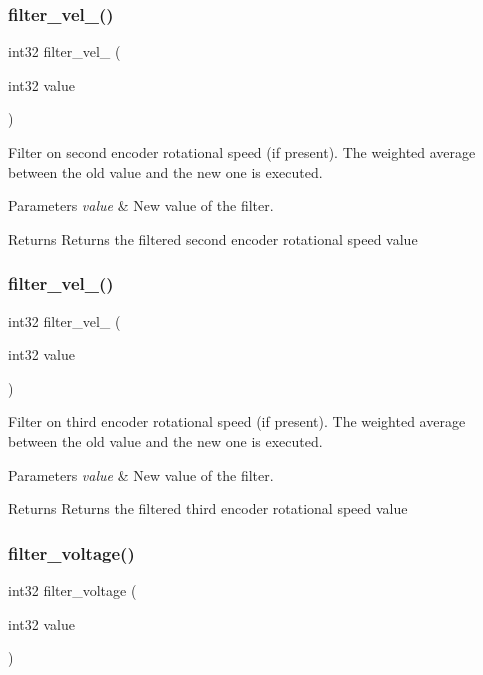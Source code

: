 \subsubsection{filter\+\_\+vel\+\_()}
{\footnotesize\ttfamily int32 filter\+\_\+vel\+\_ (\begin{DoxyParamCaption}\item[{int32}]{value }\end{DoxyParamCaption})}

Filter on second encoder rotational speed (if present). The weighted average between the old value and the new one is executed.


\begin{DoxyParams}{Parameters}
{\em value} & New value of the filter.\\
\hline
\end{DoxyParams}
\begin{DoxyReturn}{Returns}
Returns the filtered second encoder rotational speed value 
\end{DoxyReturn}
\mbox{\label{utils_8h_a70430ee90ed28e4c9fca0c4ca3d6583e}} 
\subsubsection{filter\+\_\+vel\+\_()}
{\footnotesize\ttfamily int32 filter\+\_\+vel\+\_ (\begin{DoxyParamCaption}\item[{int32}]{value }\end{DoxyParamCaption})}

Filter on third encoder rotational speed (if present). The weighted average between the old value and the new one is executed.


\begin{DoxyParams}{Parameters}
{\em value} & New value of the filter.\\
\hline
\end{DoxyParams}
\begin{DoxyReturn}{Returns}
Returns the filtered third encoder rotational speed value 
\end{DoxyReturn}
\mbox{\label{utils_8h_a31121e24e34f0c17ecd9d048577dd710}} 
\subsubsection{filter\+\_\+voltage()}
{\footnotesize\ttfamily int32 filter\+\_\+voltage (\begin{DoxyParamCaption}\item[{int32}]{value }\end{DoxyParamCaption})}

